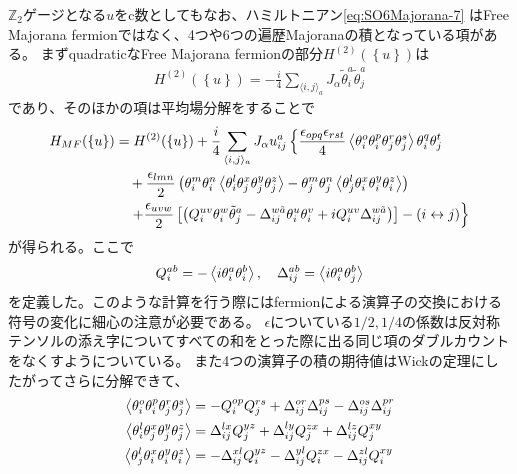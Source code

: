 \documentclass[11pt, aps, longbibliography]{article}
\begin{document}
        $\mathbb{Z}_2$ゲージとなる$u$をc数としてもなお、ハミルトニアン\eqref{eq:SO6Majorana-7}
        はFree Majorana fermionではなく、4つや6つの遍歴Majoranaの積となっている項がある。
        まずquadraticなFree Majorana fermionの部分$H^{(2)}(\left\{u\right\})$は
        \begin{align}\label{eq:SO6Majorana-8}
            H^{(2)}(\left\{u\right\}) = -\frac{i}{4}\sum_{\langle i,j \rangle_a}J_\alpha \tilde{\theta}_i^a \tilde{\theta}_j^a
        \end{align}
        であり、そのほかの項は平均場分解をすることで
        \begin{align}\label{eq:SO6Majorana-9}
            H_{MF}(\left\{u\right\}) &= H^{(2)}(\left\{u\right\}) + \frac{i}{4} \sum_{\langle i,j \rangle_a}J_\alpha u_{ij}^a \left\{ \frac{\epsilon_{opq}\epsilon_{rst}}{4} \expval{\theta_i^o\theta_i^p\theta_j^r\theta_j^s} \theta_i^q\theta_j^t  \right. \notag \\
            & \quad + \frac{\epsilon_{lmn}}{2} \left( \theta_i^m \theta_i^n \expval{\theta_i^l\theta_j^x\theta_j^y\theta_j^z} - \theta_j^m \theta_j^n \expval{\theta_j^l\theta_i^x\theta_i^y\theta_i^z} \right) \notag \\
            & \left. \quad + \frac{\epsilon_{uvw}}{2} \left[ \left( Q_i^{uv}\theta_i^w\tilde{\theta}_j^a - \Delta_{ij}^{w\tilde{a}}\theta_i^u\theta_i^v + iQ_i^{uv}\Delta_{ij}^{w\tilde{a}} \right) \right] - (i \leftrightarrow  j)\right\}
        \end{align}
        が得られる。ここで
        \begin{equation}\label{eq:SO6Majorana-10}
            Q_i^{ab} = -\expval{i\theta_i^a\theta_i^b}, \quad \Delta_{ij}^{ab} = \expval{i\theta_i^a\theta_j^b}
        \end{equation}
        を定義した。このような計算を行う際にはfermionによる演算子の交換における符号の変化に細心の注意が必要である。
        $\epsilon$についている$1/2,1/4$の係数は反対称テンソルの添え字についてすべての和をとった際に出る同じ項のダブルカウントをなくすようについている。
        また4つの演算子の積の期待値はWickの定理にしたがってさらに分解できて、
        \begin{align}\label{eq:SO6Majorana-11}
            \expval{\theta_i^o\theta_i^p\theta_j^r\theta_j^s} &= -Q_i^{op}Q_j^{rs} + \Delta_{ij}^{or}\Delta_{ij}^{ps} - \Delta_{ij}^{os}\Delta_{ij}^{pr} \notag \\
            \expval{\theta_i^l\theta_j^x\theta_j^y\theta_j^z} &= \Delta_{ij}^{lx}Q_j^{yz} + \Delta_{ij}^{ly}Q_j^{zx} + \Delta_{ij}^{lz}Q_j^{xy} \\
            \expval{\theta_j^l\theta_i^x\theta_i^y\theta_i^z} &= -\Delta_{ij}^{xl}Q_i^{yz} - \Delta_{ij}^{yl}Q_i^{zx} - \Delta_{ij}^{zl}Q_i^{xy} \notag
        \end{align}
\end{document}
